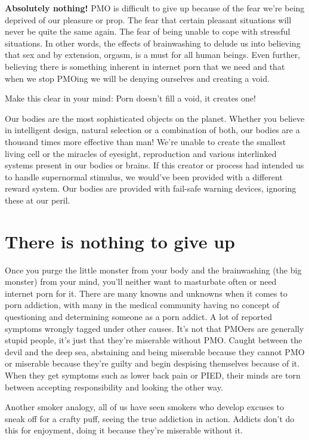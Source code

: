 \documentclass[easypeasy.tex]{subfiles}
\begin{document}
\textbf{Absolutely nothing!} PMO is difficult to give up because of the fear we're being deprived of our pleasure or prop. The fear that certain pleasant situations will never be quite the same again. The fear of being unable to cope with stressful situations. In other words, the effects of brainwashing to delude us into believing that sex and by extension, orgasm, is a must for all human beings. Even further, believing there is something inherent in internet porn that we need and that when we stop PMOing we will be denying ourselves and creating a void.

Make this clear in your mind:
  {\Large Porn doesn't fill a void, it creates one!}

Our bodies are the most sophisticated objects on the planet. Whether you believe in intelligent design, natural selection or a combination of both, our bodies are a thousand times more effective than man! We're unable to create the smallest living cell or the miracles of eyesight, reproduction and various interlinked systems present in our bodies or brains. If this creator or process had intended us to handle supernormal stimulus, we would've been provided with a different reward system. Our bodies are provided with fail-safe warning devices, ignoring these at our peril.

\section{There is nothing to give up}
Once you purge the little monster from your body and the brainwashing (the big monster) from your mind, you'll neither want to masturbate often or need internet porn for it. There are many knowns and unknowns when it comes to porn addiction, with many in the medical community having no concept of questioning and determining someone as a porn addict. A lot of reported symptoms wrongly tagged under other causes. It's not that PMOers are generally stupid people, it's just that they're miserable without PMO. Caught between the devil and the deep sea, abstaining and being miserable because they cannot PMO or miserable because they're guilty and begin despising themselves because of it. When they get symptoms such as lower back pain or PIED, their minds are torn between accepting responsibility and looking the other way.

Another smoker analogy, all of us have seen smokers who develop excuses to sneak off for a crafty puff, seeing the true addiction in action. Addicts don't do this for enjoyment, doing it because they're miserable without it.
\end{document}
